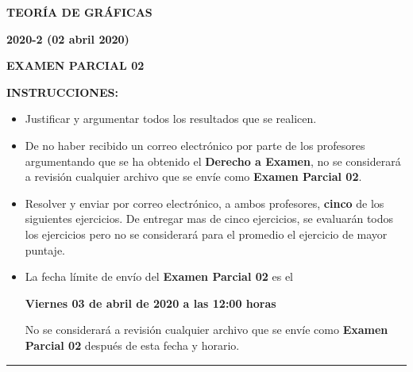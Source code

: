 \documentclass[12pt]{report}
\begin{document}
\begin{center}
\textbf{\LARGE {TEORÍA DE GRÁFICAS}}
\end{center}

\begin{center}
\textbf{{\large 2020-2 (02 abril 2020)}}
\end{center}

\begin{center}
\textbf{{\large EXAMEN PARCIAL 02}}
\end{center}

{\bf INSTRUCCIONES:}
\begin{itemize}
\item Justificar y argumentar todos los resultados que se realicen.

\item De no haber recibido un correo electrónico por parte de los profesores argumentando que se ha obtenido el \textbf{Derecho a Examen}, no se considerará a revisión cualquier archivo que se envíe como \textbf{Examen Parcial 02}.

\item Resolver y enviar por correo electrónico, a ambos profesores, \textbf{cinco} de los siguientes ejercicios. De entregar mas de cinco ejercicios, se evaluarán todos los ejercicios pero no se considerará para el promedio el ejercicio de mayor puntaje.

\item La fecha límite de envío del \textbf{Examen Parcial 02} es el
\begin{center}
\textbf{Viernes 03 de abril de 2020 a las 12:00 horas}
\end{center}
No se considerará a revisión cualquier archivo que se envíe como \textbf{Examen Parcial 02} después de esta fecha y horario.

\end{itemize}

\begin{center}
\rule[0mm]{20cm}{0.2mm}
\end{center}
\end{document}
